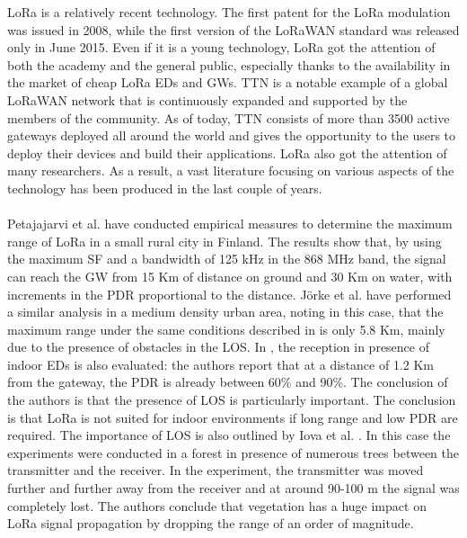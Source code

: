 LoRa is a relatively recent technology. The first patent for the LoRa modulation was issued in 2008, while the first version of the LoRaWAN standard was released only in June 2015. Even if it is a young technology, LoRa got the attention of both the academy and the general public, especially thanks to the availability in the market of cheap LoRa \glspl{ED} and \glspl{GW}. \gls{TTN} is a notable example of a global LoRaWAN network that is continuously expanded and supported by the members of the community. As of today, \gls{TTN} consists of more than 3500 active gateways deployed all around the world and gives the opportunity to the users to deploy their devices and build their applications. LoRa also got the attention of many researchers. As a result, a vast literature focusing on various aspects of the technology has been produced in the last couple of years. \\ \\
Petajajarvi et al. \cite{ref:soa-lora-range1} have conducted empirical measures to determine the maximum range of LoRa in a small rural city in Finland. The results show that, by using the maximum \gls{SF} and a bandwidth of 125 kHz in the 868 MHz band, the signal can reach the \gls{GW} from 15 Km of distance on ground and 30 Km on water, with increments in the \gls{PDR} proportional to the distance. Jörke et al. \cite{ref:soa-lora-range2} have performed a similar analysis in a medium density urban area, noting in this case, that the maximum range under the same conditions described in \cite{ref:soa-lora-range1} is only 5.8 Km, mainly due to the presence of obstacles in the \gls{LOS}. In \cite{ref:soa-lora-range3}, the reception in presence of indoor \glspl{ED} is also evaluated: the authors report that at a distance of 1.2 Km from the gateway, the \gls{PDR} is already between 60\% and 90\%. The conclusion of the authors is that the presence of \gls{LOS} is particularly important. The conclusion is that LoRa is not suited for indoor environments if long range and low \gls{PDR} are required. The importance of \gls{LOS} is also outlined by Iova et al. \cite{ref:soa-lora-mountains}. In this case the experiments were conducted in a forest in presence of numerous trees between the transmitter and the receiver. In the experiment, the transmitter was moved further and further away from the receiver and at around 90-100 m the signal was completely lost. The authors conclude that vegetation has a huge impact on LoRa signal propagation by dropping the range of an order of magnitude. \\ \\
